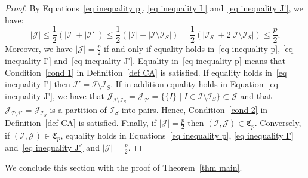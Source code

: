 \documentclass[AHL,Unicode,longabstracts,published]{cedram}
\newcommand{\I}{\mathcal{I}}
\newcommand{\J}{\mathcal{J}}
\newcommand{\frkC}{\mathfrak{C}}
\newcommand{\norm}[1]{\left\lvert #1 \right\rvert}
\renewcommand{\leq}{\leqslant}
\begin{document}
\begin{proof}
By Equations~\eqref{eq inequality p}, \eqref{eq inequality I'} and~\eqref{eq inequality J'}, we have:
\begin{equation}\label{eq inequality J}
\norm{\J} \leq \frac{1}{2}\left(\norm{\I}+\norm{\I'}\right) \leq \frac{1}{2}\left(\norm{\I}+\norm{\I \setminus \I_S}\right) = \frac{1}{2}\left(\norm{\I_S} + 2 \norm{\I \setminus \I_S}\right) \leq \frac{p}{2}.
\end{equation}
Moreover, we have $|\J| = \tfrac{p}{2}$ if and only if equality holds in~\eqref{eq inequality p}, \eqref{eq inequality I'} and~\eqref{eq inequality J'}. Equality in~\eqref{eq inequality p} means that Condition~\eqref{cond 1} in Definition~\ref{def CA} is satisfied. If equality holds in~\eqref{eq inequality I'} then $\I' = \I \setminus \I_S$. If in addition equality holds in Equation~\eqref{eq inequality J'}, we have that $\J_{\I \setminus \I_S} = \J_{\I'} = \{\{I\} \mid I \in \I \setminus \I_S\} \subset \J$ and that $\J_{\I \setminus \I'} = \J_{\I_S}$ is a partition of $\I_S$ into pairs. Hence, Condition~\eqref{cond 2} in Definition~\ref{def CA} is satisfied. Finally, if $|\J| = \tfrac{p}{2}$ then $(\I,\J) \in \frkC_p$. Conversely, if $(\I,\J) \in \frkC_p$, equality holds in Equations~\eqref{eq inequality p}, \eqref{eq inequality I'} and~\eqref{eq inequality J'} and $|\J| = \tfrac{p}{2}$.
\end{proof}

We conclude this section with the proof of Theorem~\ref{thm main}.
\end{document}
